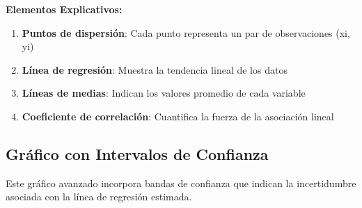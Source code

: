 \documentclass[
  spanish,
  letterpaper,
]{book}
\begin{document}
\textbf{Elementos Explicativos:}

\begin{enumerate}
\def\labelenumi{\arabic{enumi}.}
\item
  \textbf{Puntos de dispersión}: Cada punto representa un par de
  observaciones (xi, yi)
\item
  \textbf{Línea de regresión}: Muestra la tendencia lineal de los datos
\item
  \textbf{Líneas de medias}: Indican los valores promedio de cada
  variable
\item
  \textbf{Coeficiente de correlación}: Cuantifica la fuerza de la
  asociación lineal
\end{enumerate}

\subsection{Gráfico con Intervalos de
Confianza}\label{gruxe1fico-con-intervalos-de-confianza}

Este gráfico avanzado incorpora bandas de confianza que indican la
incertidumbre asociada con la línea de regresión estimada.
\end{document}
